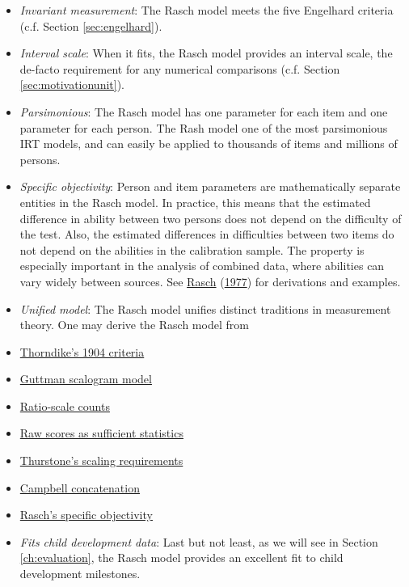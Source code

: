 \documentclass[
]{book}
\begin{document}
\begin{itemize}
\item
  \emph{Invariant measurement}: The Rasch model meets the five Engelhard criteria (c.f. Section \ref{sec:engelhard}).
\item
  \emph{Interval scale}: When it fits, the Rasch model provides an interval scale, the de-facto requirement for any numerical comparisons (c.f. Section \ref{sec:motivationunit}).
\item
  \emph{Parsimonious}: The Rasch model has one parameter for each item and one parameter for each person. The Rash model one of the most parsimonious IRT models, and can easily be applied to thousands of items and millions of persons.
\item
  \emph{Specific objectivity}: Person and item parameters are mathematically separate entities in the Rasch model. In practice, this means that the estimated difference in ability between two persons does not depend on the difficulty of the test. Also, the estimated differences in difficulties between two items do not depend on the abilities in the calibration sample. The property is especially important in the analysis of combined data, where abilities can vary widely between sources. See \protect\hyperlink{ref-rasch1977}{Rasch} (\protect\hyperlink{ref-rasch1977}{1977}) for derivations and examples.
\item
  \emph{Unified model}: The Rasch model unifies distinct traditions in measurement theory. One may derive the Rasch model from
\item
  \href{https://www.rasch.org/rmt/rmt143g.htm}{Thorndike's 1904 criteria}
\item
  \href{https://www.rasch.org/rmt/rmt63e.htm}{Guttman scalogram model}
\item
  \href{https://www.rasch.org/rmt/rmt62c.htm}{Ratio-scale counts}
\item
  \href{https://www.rasch.org/rmt/rmt32e.htm}{Raw scores as sufficient statistics}
\item
  \href{https://www.rasch.org/rmt/rmt21a.htm}{Thurstone's scaling requirements}
\item
  \href{https://www.rasch.org/rmt/rmt21b.htm}{Campbell concatenation}
\item
  \href{https://www.rasch.org/rmt/rmt11a.htm}{Rasch's specific objectivity}
\item
  \emph{Fits child development data}: Last but not least, as we will see in Section \ref{ch:evaluation}, the Rasch model provides an excellent fit to child development milestones.
\end{itemize}
\end{document}
